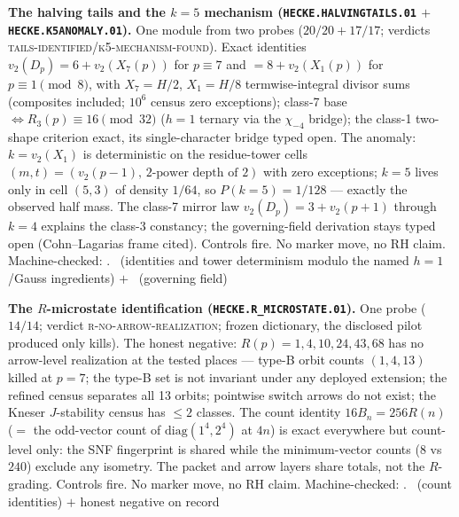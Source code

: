 \par\smallskip\noindent\textbf{The halving tails and the $k=5$
mechanism (\texttt{HECKE.HALVINGTAILS.01} $+$
\texttt{HECKE.K5ANOMALY.01}).}
One module from two probes ($20/20+17/17$; verdicts
\textsc{tails-identified}/\textsc{k5-mechanism-found}).  Exact
identities $v_2(D_p)=6+v_2(X_7(p))$ for $p\equiv7$ and
$=8+v_2(X_1(p))$ for $p\equiv1\pmod 8$, with $X_7=H/2$, $X_1=H/8$
termwise-integral divisor sums (composites included; $10^6$ census
zero exceptions); class-7 base $\iff R_3(p)\equiv16\pmod{32}$
($h=1$ ternary via the $\chi_{-4}$ bridge); the class-1 two-shape
criterion exact, its single-character bridge typed open.  The
anomaly: $k=v_2(X_1)$ is deterministic on the residue-tower cells
$(m,t)=(v_2(p{-}1),\,\text{2-power depth of }2)$ with zero
exceptions; $k=5$ lives only in cell $(5,3)$ of density $1/64$, so
$P(k{=}5)=1/128$ --- exactly the observed half mass.  The class-7
mirror law $v_2(D_p)=3+v_2(p{+}1)$ through $k=4$ explains the
class-3 constancy; the governing-field derivation stays typed open
(Cohn--Lagarias frame cited).  Controls fire.  No marker move, no
RH claim.
Machine-checked: .
\mE\ (identities and tower determinism modulo the named $h=1$/Gauss
ingredients) $+$ \mO\ (governing field)
\par\smallskip



\par\smallskip\noindent\textbf{The $R$-microstate identification
(\texttt{HECKE.R\_MICROSTATE.01}).}
One probe ($14/14$; verdict \textsc{r-no-arrow-realization};
frozen dictionary, the disclosed pilot produced only kills).  The
honest negative: $R(p)=1,4,10,24,43,68$ has no arrow-level
realization at the tested places --- type-B orbit counts $(1,4,13)$
killed at $p=7$; the type-B set is not invariant under any deployed
extension; the refined census separates all 13 orbits; pointwise
switch arrows do not exist; the Kneser $J$-stability census has
$\le2$ classes.  The count identity $16B_n=256R(n)$ ($=$ the
odd-vector count of $\mathrm{diag}(1^4,2^4)$ at $4n$) is exact
everywhere but count-level only: the SNF fingerprint is shared while
the minimum-vector counts ($8$ vs $240$) exclude any isometry.  The
packet and arrow layers share totals, not the $R$-grading.  Controls
fire.  No marker move, no RH claim.
Machine-checked: .
\mE\ (count identities) $+$ honest negative on record
\par\smallskip



